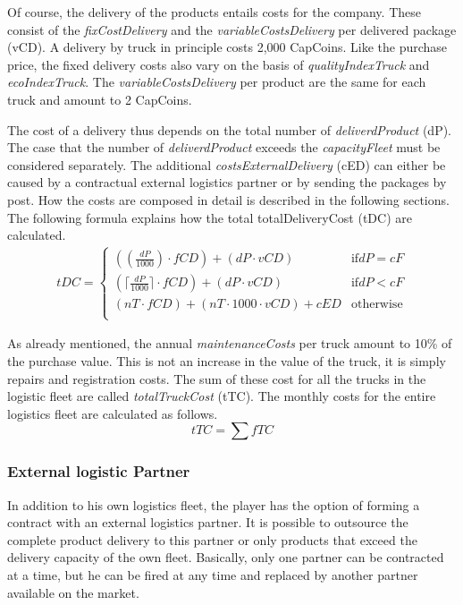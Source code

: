 Of course, the delivery of the products entails costs for the company. These consist of the \textit{fixCostDelivery} and the \textit{variableCostsDelivery} per delivered package (\gls{vCD}). 
A delivery by truck in principle costs 2,000 CapCoins. Like the purchase price, the fixed delivery costs also vary on the basis of \textit{qualityIndexTruck} and \textit{ecoIndexTruck}. The \textit{variableCostsDelivery} per product are the same for each truck and amount to 2 CapCoins.

The cost of a delivery thus depends on the total number of \textit{deliverdProduct} (\gls{dP}). 
The case that the number of \textit{deliverdProduct} exceeds the \textit{capacityFleet} must be considered separately. The additional \textit{costsExternalDelivery} (\gls{cED}) can either be caused by a contractual external logistics partner or by sending the packages by post. How the costs are composed in detail is described in the following sections. \\
The following formula explains how the total totalDeliveryCost (\gls{tDC}) are calculated. 
\begin{equation}
\label{func:deliveryCost}
\begin{aligned}
tDC = 
\begin{cases}
    (( \frac{dP}{1000} ) \cdot fCD) + ( dP \cdot vCD) & \text{if} dP = cF\\
    (\lceil \frac{dP}{1000} \rceil \cdot fCD ) + ( dP \cdot vCD) & \text{if} dP < cF\\
    ( nT \cdot fCD ) + ( nT \cdot1000 \cdot vCD ) + cED & \text{otherwise}\\
\end{cases}
\end{aligned}
\end{equation}

As already mentioned, the annual \textit{maintenanceCosts}  per truck amount to 10\% of the purchase value. This is not an increase in the value of the truck, it is simply repairs and registration costs. The sum of these cost for all the trucks in the logistic fleet are called \textit{totalTruckCost} (\gls{tTC}). The monthly costs for the entire logistics fleet are calculated as follows. 
\begin{equation}
    tTC = \sum fTC
\end{equation}


\subsubsection{External logistic Partner}
In addition to his own logistics fleet, the player has the option of forming a contract with an external logistics partner. It is possible to outsource the complete product delivery to this partner or only products that exceed the delivery capacity of the own fleet. Basically, only one partner can be contracted at a time, but he can be fired at any time and replaced by another partner available on the market. 

